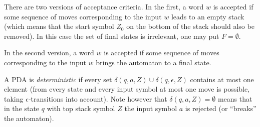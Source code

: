

\setcounter{section}{6}
\setcounter{subsection}{1}
\setcounter{dfn}{3}


There are two versions of acceptance criteria.
In the first, a word $w$ is accepted if some sequence of moves corresponding to the input $w$ leads to an empty stack
(which means that the start symbol $Z_0$ on the bottom of the stack should also be removed).
In this case the set of final states is irrelevant, one may put $F = \emptyset$.

In the second version, a word $w$ is accepted if some sequence of moves corresponding to the input $w$ brings the automaton to a final state.

A PDA is \emph{deterministic} if every set $\delta(q, a, Z) \cup \delta(q, \epsilon, Z)$ contains at most one element
(from every state and every input symbol at most one move is possible, taking $\epsilon$-transitions into account).
Note however that $\delta(q, a, Z) = \emptyset$ means that in the state $q$ with top stack symbol $Z$
the input symbol $a$ is rejected (or ``breaks'' the automaton).


